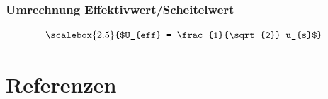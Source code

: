 
\begin{frame}
  \frametitle{Umrechnung Effektivwert/Scheitelwert}
  \begin{align}
    	\scalebox{2.5}{$U_{eff} = \frac{1}{\sqrt{2}} u_{s}$}
  \end{align}
\end{frame}

\section*{Referenzen}

